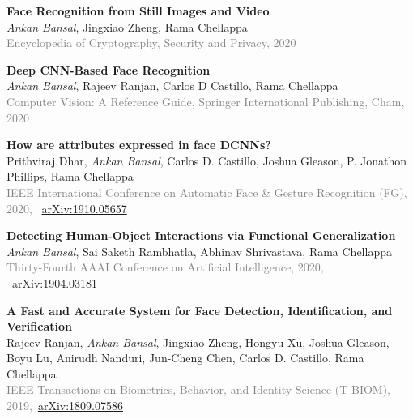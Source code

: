 \documentclass[11pt, a4paper]{article}
\begin{document}
\vspace{4pt}

\textbf{Face Recognition from Still Images and Video}\\
\textit{Ankan Bansal}, Jingxiao Zheng, Rama Chellappa\\
\textcolor{gray}{Encyclopedia of Cryptography, Security and Privacy, 2020}

\vspace{4pt}

\textbf{Deep CNN-Based Face Recognition}\\
\textit{Ankan Bansal}, Rajeev Ranjan, Carlos D Castillo, Rama Chellappa\\
\textcolor{gray}{Computer Vision: A Reference Guide, Springer International Publishing, Cham, 2020}

%
\vspace{4pt}

\textbf{How are attributes expressed in face DCNNs?}\\
Prithviraj Dhar, \textit{Ankan Bansal}, Carlos D. Castillo, Joshua Gleason, P. Jonathon Phillips, Rama Chellappa\\
\textcolor{gray}{IEEE International Conference on Automatic Face \& Gesture Recognition (FG), 2020,} ~\href{https://arxiv.org/abs/1910.05657}{arXiv:1910.05657}

\vspace{4pt}

\textbf{Detecting Human-Object Interactions via Functional Generalization}\\
\textit{Ankan Bansal}, Sai Saketh Rambhatla, Abhinav Shrivastava, Rama Chellappa\\
\textcolor{gray}{Thirty-Fourth AAAI Conference on Artificial Intelligence, 2020,} ~\href{https://arxiv.org/abs/1904.03181}{arXiv:1904.03181}

\vspace{4pt}

\textbf{A Fast and Accurate System for Face Detection, Identification, and Verification} \\
Rajeev Ranjan, \textit{Ankan Bansal}, Jingxiao Zheng, Hongyu Xu, Joshua Gleason, Boyu Lu, Anirudh
Nanduri, Jun-Cheng Chen, Carlos D. Castillo, Rama Chellappa\\
\textcolor{gray}{IEEE Transactions on Biometrics, Behavior, and Identity Science (T-BIOM), 2019,}~\href{https://arxiv.org/abs/1809.07586}{arXiv:1809.07586}
\end{document}
